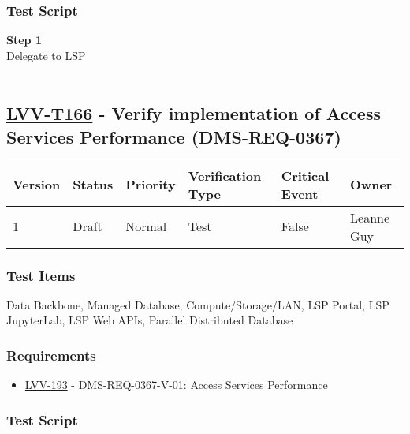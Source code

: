 \hypertarget{test-script-142}{%
\subsubsection{Test Script}\label{test-script-142}}

\textbf{Step 1}\\
Delegate to LSP\\
~\\

\hypertarget{lvv-t166---verify-implementation-of-access-services-performance-dms-req-0367}{%
\subsection{\texorpdfstring{\href{https://jira.lsstcorp.org/secure/Tests.jspa\#/testCase/LVV-T166}{LVV-T166}
- Verify implementation of Access Services Performance
(DMS-REQ-0367)}{LVV-T166 - Verify implementation of Access Services Performance (DMS-REQ-0367)}}\label{lvv-t166---verify-implementation-of-access-services-performance-dms-req-0367}}

\begin{longtable}[]{@{}llllll@{}}
\toprule
Version & Status & Priority & Verification Type & Critical Event &
Owner\tabularnewline
\midrule
\endhead
1 & Draft & Normal & Test & False & Leanne Guy\tabularnewline
\bottomrule
\end{longtable}

\hypertarget{test-items-142}{%
\subsubsection{Test Items}\label{test-items-142}}

Data Backbone, Managed Database, Compute/Storage/LAN, LSP Portal, LSP
JupyterLab, LSP Web APIs, Parallel Distributed Database~

\hypertarget{requirements-143}{%
\subsubsection{Requirements}\label{requirements-143}}

\begin{itemize}
\tightlist
\item
  \href{https://jira.lsstcorp.org/browse/LVV-193}{LVV-193} -
  DMS-REQ-0367-V-01: Access Services Performance
\end{itemize}

\hypertarget{test-script-143}{%
\subsubsection{Test Script}\label{test-script-143}}

